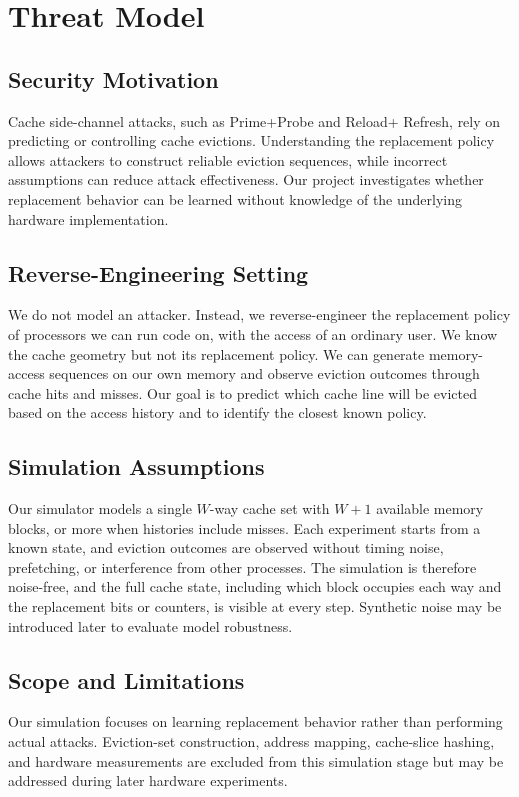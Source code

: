 \section{Threat Model}
\label{sec:threat}

\subsection{Security Motivation}
Cache side-channel attacks, such as Prime+Probe and
Reload+ Refresh, rely on predicting or controlling cache
evictions. Understanding the replacement policy allows
attackers to construct reliable eviction sequences, while
incorrect assumptions can reduce attack effectiveness.
Our project investigates whether replacement behavior can
be learned without knowledge of the underlying hardware
implementation.

\subsection{Reverse-Engineering Setting}
We do not model an attacker. Instead, we reverse-engineer
the replacement policy of processors we can run code on,
with the access of an ordinary user. We know the cache
geometry but not its replacement policy. We can generate
memory-access sequences on our own memory and observe
eviction outcomes through cache hits and misses. Our goal
is to predict which cache line will be evicted based on
the access history and to identify the closest known policy.

\subsection{Simulation Assumptions}
Our simulator models a single $W$-way cache set with $W+1$
available memory blocks, or more when histories include
misses. Each experiment starts from a known
state, and eviction outcomes are observed without timing
noise, prefetching, or interference from other processes.
The simulation is therefore noise-free, and the full cache
state, including which block occupies each way and the
replacement bits or counters, is visible at every step.
Synthetic noise may be introduced later to evaluate model
robustness.

\subsection{Scope and Limitations}
Our simulation focuses on learning replacement behavior rather
than performing actual attacks. Eviction-set construction,
address mapping, cache-slice hashing, and hardware measurements
are excluded from this simulation stage but may be addressed
during later hardware experiments.


